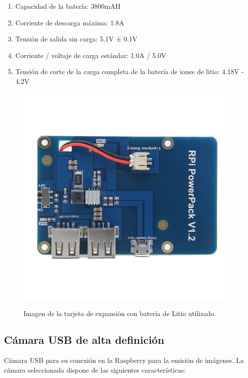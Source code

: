 \begin{enumerate}
 \item Capacidad de la batería: 3800mAH
 \item Corriente de descarga máxima: 1.8A
 \item Tensión de salida sin carga: 5.1V ± 0.1V
 \item Corriente / voltaje de carga estándar: 1.0A / 5.0V
 \item Tensión de corte de la carga completa de la batería de iones de litio: 4.18V - 4.2V
\end{enumerate}


\begin{figure}[H]
  \begin{center}
    \includegraphics[scale=0.3]{imagenes/robot/modulo-alimentacion.jpg}\\
    \caption{Imagen de la tarjeta de expansión con batería de Litio utilizado.}
  \end{center}
\end{figure}

\subsection{ Cámara USB de alta definición }

Cámara USB para su conexión en la Raspberry para la emisión de imágenes. La cámara seleccionada dispone de las siguientes características:


